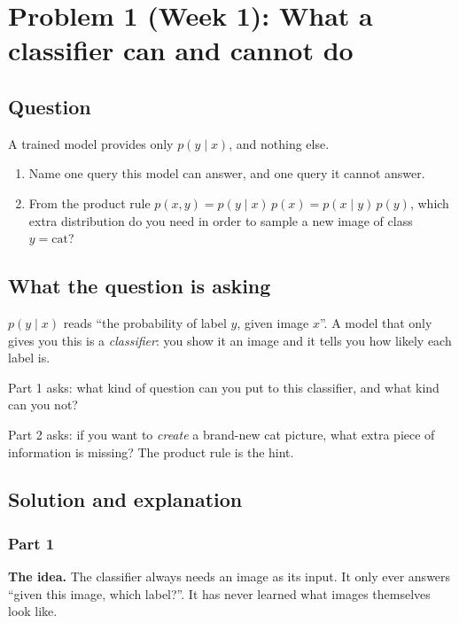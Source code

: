 \documentclass[12pt,a4paper]{article}
\begin{document}
\newpage

\section{Problem 1 (Week 1): What a classifier can and cannot do}

\subsection{Question}

A trained model provides only $p(y \mid x)$, and nothing else.

\begin{enumerate}[leftmargin=*]
\item Name one query this model can answer, and one query it cannot answer.
\item From the product rule $p(x, y) = p(y \mid x)\, p(x) = p(x \mid y)\, p(y)$, which extra distribution do you need in order to sample a new image of class $y = \text{cat}$?
\end{enumerate}

\subsection{What the question is asking}

$p(y \mid x)$ reads ``the probability of label $y$, given image $x$''. A model that only gives you this is a \emph{classifier}: you show it an image and it tells you how likely each label is.

Part 1 asks: what kind of question can you put to this classifier, and what kind can you not?

Part 2 asks: if you want to \emph{create} a brand-new cat picture, what extra piece of information is missing? The product rule is the hint.

\subsection{Solution and explanation}

\subsubsection{Part 1}

\textbf{The idea.} The classifier always needs an image as its input. It only ever answers ``given this image, which label?''. It has never learned what images themselves look like.
\end{document}
